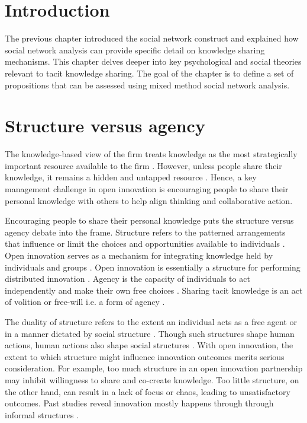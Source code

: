 
\section{Introduction}

The previous chapter introduced the social network construct and explained how social network analysis can provide specific detail on knowledge sharing mechanisms. This chapter delves deeper into key psychological and social theories relevant to tacit knowledge sharing. The goal of the chapter is to define a set of propositions that can be assessed using mixed method social network analysis. \medskip

\section{Structure versus agency}

The knowledge-based view of the firm treats knowledge as the most strategically important resource available to the firm \citep{grant1996toward}. However, unless people share their knowledge, it remains a hidden and untapped resource \citep{davenport1998working}. Hence, a key management challenge in open innovation is encouraging people to share their personal knowledge with others to help align thinking and collaborative action. \medskip

Encouraging people to share their personal knowledge puts the structure versus agency debate into the frame. Structure refers to the patterned arrangements that influence or limit the choices and opportunities available to individuals \citep{bandura1999social}. Open innovation serves as a mechanism for integrating knowledge held by individuals and groups \citep{grant1995knowledge}. Open innovation is essentially a structure for performing distributed innovation \citep{lichtenthaler2011open}. Agency is the capacity of individuals to act independently and make their own free choices \citep{barker2016cultural}. Sharing tacit knowledge is an act of volition or free-will i.e. a form of agency \citep{leonard1998role}. \medskip

The duality of structure refers to the extent an individual acts as a free agent or in a manner dictated by social structure \citep{giddens1984constitution,sewell1992theory}. Though such structures shape human actions, human actions also shape social structures \citep{sewell1992theory}. With open innovation, the extent to which structure might influence innovation outcomes merits serious consideration. For example, too much structure in an open innovation partnership may inhibit willingness to share and co-create knowledge. Too little structure, on the other hand, can result in a lack of focus or chaos, leading to unsatisfactory outcomes. Past studies reveal innovation mostly happens through through informal structures \citep{allen1977role,ibarra1993network,selnes2003promoting}. 

